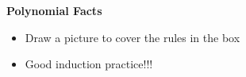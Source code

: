 \item \textbf{Polynomial Facts}
\begin{itemize}
\item Draw a picture to cover the rules in the box
\item Good induction practice!!!
\end{itemize}